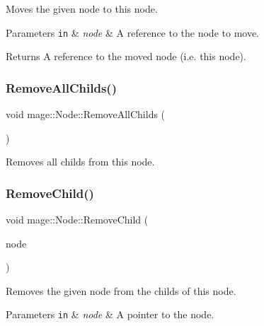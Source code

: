 Moves the given node to this node.


\begin{DoxyParams}[1]{Parameters}
\mbox{\tt in}  & {\em node} & A reference to the node to move. \\
\hline
\end{DoxyParams}
\begin{DoxyReturn}{Returns}
A reference to the moved node (i.\+e. this node). 
\end{DoxyReturn}
\hypertarget{classmage_1_1_node_a601804f7da1df59d5f0bd91a68dc7282}{}\label{classmage_1_1_node_a601804f7da1df59d5f0bd91a68dc7282} 
\subsubsection{\texorpdfstring{Remove\+All\+Childs()}{RemoveAllChilds()}}
{\footnotesize\ttfamily void mage\+::\+Node\+::\+Remove\+All\+Childs (\begin{DoxyParamCaption}{ }\end{DoxyParamCaption})\hspace{0.3cm}{\ttfamily [noexcept]}}

Removes all childs from this node. \hypertarget{classmage_1_1_node_a0654443d58730ebc7471626a38c2bc7f}{}\label{classmage_1_1_node_a0654443d58730ebc7471626a38c2bc7f} 
\subsubsection{\texorpdfstring{Remove\+Child()}{RemoveChild()}}
{\footnotesize\ttfamily void mage\+::\+Node\+::\+Remove\+Child (\begin{DoxyParamCaption}\item[{\hyperlink{classmage_1_1_node_ac575dc006e0ae1134277ade977dc06b6}{Node\+Ptr}}]{node }\end{DoxyParamCaption})}

Removes the given node from the childs of this node.


\begin{DoxyParams}[1]{Parameters}
\mbox{\tt in}  & {\em node} & A pointer to the node. \\
\hline
\end{DoxyParams}
\hypertarget{classmage_1_1_node_aabbe500cdf7842b663bfcf034de25c5a}{}\label{classmage_1_1_node_aabbe500cdf7842b663bfcf034de25c5a} 
